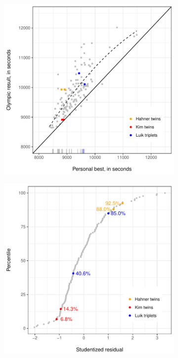 \documentclass[12pt,titlepage]{article}
\begin{document}
\begin{figure}[!ht]
  \caption{Olympic results as a function of ability measured by personal best}
  \label{fig:scatter}
  \begin{subfigure}{.5\textwidth}
    \centering
    \includegraphics[width=\textwidth, keepaspectratio]{scatter_plot.pdf}
    \caption{} 
    \label{fig:45degreeplot}
  \end{subfigure}
  \begin{subfigure}{.5\textwidth}
    \centering
    \includegraphics[width=\textwidth, keepaspectratio]{studentized_residuals.pdf}
    \caption{}
    \label{fig:studentizedresiduals}
  \end{subfigure}
\end{figure}
\end{document}
